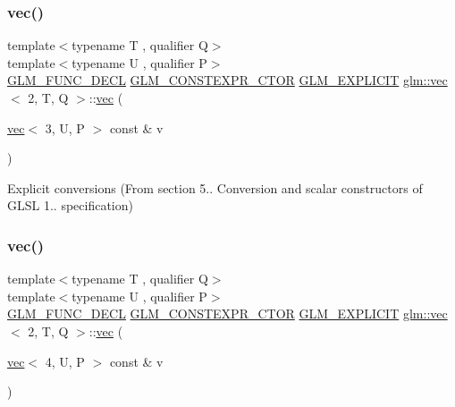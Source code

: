 \mbox{\label{structglm_1_1vec_3_012_00_01_t_00_01_q_01_4_a5b7cfdc305cd9c9cbedd6bdb8348e48c}} 
\subsubsection{\texorpdfstring{vec()}{vec()}\hspace{0.1cm}{\footnotesize\ttfamily [8/17]}}
{\footnotesize\ttfamily template$<$typename T , qualifier Q$>$ \\
template$<$typename U , qualifier P$>$ \\
\hyperlink{setup_8hpp_ab2d052de21a70539923e9bcbf6e83a51}{G\+L\+M\+\_\+\+F\+U\+N\+C\+\_\+\+D\+E\+CL} \hyperlink{setup_8hpp_ad34178a09666081abdb573c14d1f4a5a}{G\+L\+M\+\_\+\+C\+O\+N\+S\+T\+E\+X\+P\+R\+\_\+\+C\+T\+OR} \hyperlink{setup_8hpp_a6c74f5a5e7b134ab69023ff9a30d4d5d}{G\+L\+M\+\_\+\+E\+X\+P\+L\+I\+C\+IT} \hyperlink{structglm_1_1vec}{glm\+::vec}$<$ 2, T, Q $>$\+::\hyperlink{structglm_1_1vec}{vec} (\begin{DoxyParamCaption}\item[{\hyperlink{structglm_1_1vec}{vec}$<$ 3, U, P $>$ const \&}]{v }\end{DoxyParamCaption})}



Explicit conversions (From section 5.. Conversion and scalar constructors of G\+L\+SL 1.. specification) 

\mbox{\label{structglm_1_1vec_3_012_00_01_t_00_01_q_01_4_a2f77cbeba0c2efa024d10e348636c7c1}} 
\subsubsection{\texorpdfstring{vec()}{vec()}\hspace{0.1cm}{\footnotesize\ttfamily [9/17]}}
{\footnotesize\ttfamily template$<$typename T , qualifier Q$>$ \\
template$<$typename U , qualifier P$>$ \\
\hyperlink{setup_8hpp_ab2d052de21a70539923e9bcbf6e83a51}{G\+L\+M\+\_\+\+F\+U\+N\+C\+\_\+\+D\+E\+CL} \hyperlink{setup_8hpp_ad34178a09666081abdb573c14d1f4a5a}{G\+L\+M\+\_\+\+C\+O\+N\+S\+T\+E\+X\+P\+R\+\_\+\+C\+T\+OR} \hyperlink{setup_8hpp_a6c74f5a5e7b134ab69023ff9a30d4d5d}{G\+L\+M\+\_\+\+E\+X\+P\+L\+I\+C\+IT} \hyperlink{structglm_1_1vec}{glm\+::vec}$<$ 2, T, Q $>$\+::\hyperlink{structglm_1_1vec}{vec} (\begin{DoxyParamCaption}\item[{\hyperlink{structglm_1_1vec}{vec}$<$ 4, U, P $>$ const \&}]{v }\end{DoxyParamCaption})}



